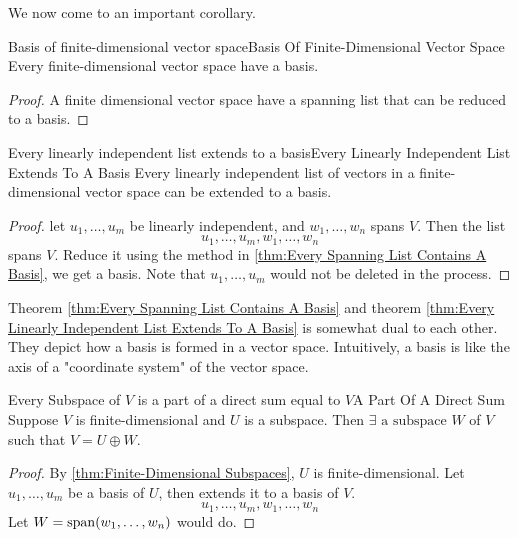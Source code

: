 \documentclass[../main.tex]{subfiles}
\begin{document}
We now come to an important corollary.
\begin{corollary}{Basis of finite-dimensional vector space}{Basis Of Finite-Dimensional Vector Space}
Every finite-dimensional vector space have a basis.
\end{corollary}
\begin{proof}
A finite dimensional vector space have a spanning list that can be reduced to a basis.
\end{proof}

\begin{theorem}{Every linearly independent list extends to a basis}{Every Linearly Independent List Extends To A Basis}
Every linearly independent list of vectors in a finite-dimensional vector space can be extended to a  basis.
\end{theorem}
\begin{proof}
let $u_1, \ldots ,u_m$ be linearly independent, and $w_1, \ldots ,w_n$ spans $V$. Then the list
\begin{equation*}
u_1, \ldots ,u_m, w_1, \ldots ,w_n
\end{equation*}
spans $V$. Reduce it using the method in \ref{thm:Every Spanning List Contains A Basis}, we get a basis. Note that $u_1, \ldots ,u_m$ would not be deleted in the process.
\end{proof}

\begin{remark}
	Theorem \ref{thm:Every Spanning List Contains A Basis} and theorem \ref{thm:Every Linearly Independent List Extends To A Basis} is somewhat dual to each other. They depict how a basis is formed in a vector space. Intuitively, a basis is like the axis of a "coordinate system" of the vector space.
\end{remark}

\begin{corollary}{Every Subspace of $V$ is a part of a direct sum equal to $V$}{A Part Of A Direct Sum}
Suppose $V$ is finite-dimensional and $U$ is a subspace. Then $\exists \text{ a subspace }W$ of $V$ such that $V = U \oplus W$.
\end{corollary}
\begin{proof}
	By \ref{thm:Finite-Dimensional Subspaces}, $U$ is finite-dimensional. Let $u_1, \ldots ,u_m$ be a basis of $U$, then extends it to a basis of $V$. 
	\begin{equation*}
	u_1, \ldots ,u_m, w_1, \ldots ,w_n
	\end{equation*}
	Let $W = \operatorname{span}(w_1, \ldots ,w_n)$ would do.
\end{proof}
\end{document}
